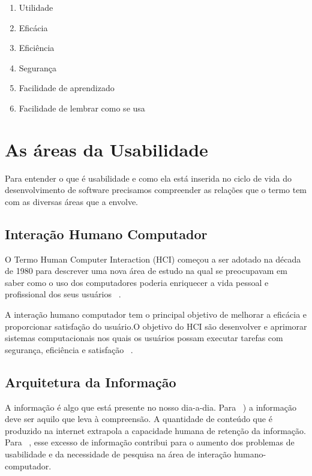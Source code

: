 \begin{enumerate}
\item Utilidade
\item Eficácia
\item Eficiência
\item Segurança
\item Facilidade de aprendizado
\item Facilidade de lembrar como se usa
\end{enumerate}


\section{As áreas da Usabilidade}

	Para entender o que é usabilidade e como ela está inserida no ciclo de vida do desenvolvimento de software precisamos compreender as relações que o termo tem com as diversas áreas que a envolve. 

\subsection{Interação Humano Computador}

	O Termo Human Computer Interaction  (HCI) começou a ser adotado na década de 1980 para descrever uma nova área de estudo na qual se preocupavam em saber como o uso dos computadores poderia enriquecer a vida pessoal e profissional dos seus usuários ~\cite{moraes2002}.
 
	A interação humano computador tem o principal objetivo de melhorar a eficácia e proporcionar satisfação do usuário.O objetivo do HCI são desenvolver e aprimorar sistemas computacionais nos quais os usuários possam executar tarefas com segurança, eficiência e satisfação ~\cite{preece2007}.
	
\subsection{Arquitetura da Informação}

A informação é algo que está presente no nosso dia-a-dia. Para ~\cite{wurman1991}) a informação deve ser aquilo que leva à compreensão. A quantidade de conteúdo que é produzido na internet extrapola a capacidade humana de retenção da informação. Para ~, esse excesso de informação contribui para o aumento dos problemas de usabilidade e da necessidade de pesquisa na área de interação humano-computador.

